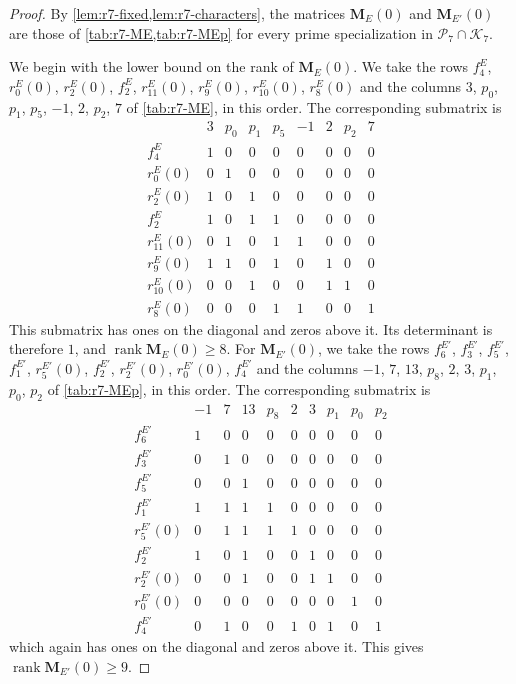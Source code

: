 \documentclass[12pt,oneside,openany]{book}
\theoremstyle{definition}
\theoremstyle{plain}
\numberwithin{equation}{chapter}
\theoremstyle{plain}
\theoremstyle{definition}
\theoremstyle{remark}
\DeclareMathOperator{\rk}{rank}
\newcommand{\cP}{\mathcal P}
\newcommand{\cK}{\mathcal K}
\begin{document}
\begin{proof}
By \cref{lem:r7-fixed,lem:r7-characters}, the matrices
$\mathbf M_E(0)$ and $\mathbf M_{E'}(0)$ are those of
\cref{tab:r7-ME,tab:r7-MEp} for every prime specialization in
$\cP_7\cap\cK_7$.

We begin with the lower bound on the rank of $\mathbf M_E(0)$. We take the
rows $f^E_4$, $r^E_0(0)$, $r^E_2(0)$, $f^E_2$, $r^E_{11}(0)$, $r^E_9(0)$,
$r^E_{10}(0)$, $r^E_8(0)$ and the
columns $3$, $p_0$, $p_1$, $p_5$, $-1$, $2$, $p_2$, $7$ of
\cref{tab:r7-ME}, in this order. The corresponding submatrix is
\[
\begin{array}{c|cccccccc}
 & 3 & p_0 & p_1 & p_5 & -1 & 2 & p_2 & 7\\\hline
f^E_4 & 1 & 0 & 0 & 0 & 0 & 0 & 0 & 0 \\
r^{E}_0(0) & 0 & 1 & 0 & 0 & 0 & 0 & 0 & 0 \\
r^{E}_2(0) & 1 & 0 & 1 & 0 & 0 & 0 & 0 & 0 \\
f^E_2 & 1 & 0 & 1 & 1 & 0 & 0 & 0 & 0 \\
r^{E}_{11}(0) & 0 & 1 & 0 & 1 & 1 & 0 & 0 & 0 \\
r^{E}_9(0) & 1 & 1 & 0 & 1 & 0 & 1 & 0 & 0 \\
r^{E}_{10}(0) & 0 & 0 & 1 & 0 & 0 & 1 & 1 & 0 \\
r^{E}_8(0) & 0 & 0 & 0 & 1 & 1 & 0 & 0 & 1
\end{array}
\]
This submatrix has ones on the diagonal and zeros above it. Its
determinant is therefore $1$, and $\rk\mathbf M_E(0)\ge8$. For $\mathbf M_{E'}(0)$, we
take the rows $f^{E'}_6$, $f^{E'}_3$, $f^{E'}_5$, $f^{E'}_1$, $r^{E'}_5(0)$,
$f^{E'}_2$, $r^{E'}_2(0)$, $r^{E'}_0(0)$, $f^{E'}_4$ and the columns $-1$, $7$, $13$, $p_8$,
$2$, $3$, $p_1$, $p_0$, $p_2$ of \cref{tab:r7-MEp}, in this order. The
corresponding submatrix is
\[
\begin{array}{c|ccccccccc}
 & -1 & 7 & 13 & p_8 & 2 & 3 & p_1 & p_0 & p_2\\\hline
f^{E'}_6 & 1 & 0 & 0 & 0 & 0 & 0 & 0 & 0 & 0 \\
f^{E'}_3 & 0 & 1 & 0 & 0 & 0 & 0 & 0 & 0 & 0 \\
f^{E'}_5 & 0 & 0 & 1 & 0 & 0 & 0 & 0 & 0 & 0 \\
f^{E'}_1 & 1 & 1 & 1 & 1 & 0 & 0 & 0 & 0 & 0 \\
r^{E'}_5(0) & 0 & 1 & 1 & 1 & 1 & 0 & 0 & 0 & 0 \\
f^{E'}_2 & 1 & 0 & 1 & 0 & 0 & 1 & 0 & 0 & 0 \\
r^{E'}_2(0) & 0 & 0 & 1 & 0 & 0 & 1 & 1 & 0 & 0 \\
r^{E'}_0(0) & 0 & 0 & 0 & 0 & 0 & 0 & 0 & 1 & 0 \\
f^{E'}_4 & 0 & 1 & 0 & 0 & 1 & 0 & 1 & 0 & 1
\end{array}
\]
which again has ones on the diagonal and zeros above it. This gives
$\rk\mathbf M_{E'}(0)\ge9$.


\end{proof}
\end{document}
